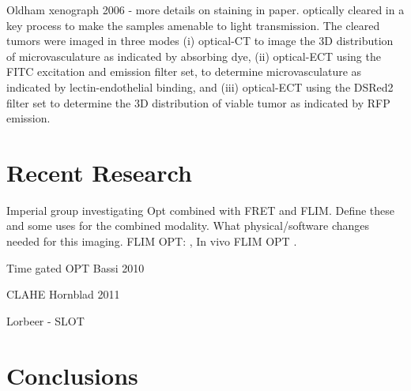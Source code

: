 \documentclass[12pt]{article}
\begin{document}
Oldham xenograph 2006 - more details on staining in paper.
optically cleared in a key process to make
 the samples amenable to light transmission. The cleared tumors were imaged in three modes (i)
 optical-CT to image the 3D distribution of microvasculature as indicated by absorbing dye, (ii)
 optical-ECT using the FITC excitation and emission filter set, to determine microvasculature as
 indicated by lectin-endothelial binding, and (iii) optical-ECT using the DSRed2 filter set to determine
 the 3D distribution of viable tumor as indicated by RFP emission. 



\section{Recent Research}

Imperial group investigating Opt combined with FRET and FLIM. Define these and some uses for the combined modality. What physical/software changes needed for this imaging.
FLIM OPT: \cite{McGinty:2008ix}, In vivo FLIM OPT \cite{McGinty:2011vm}.

 Time gated OPT Bassi 2010 \cite{Bassi:2010}
 
 CLAHE Hornblad 2011 \cite{Hornblad:2011fh}

Lorbeer - SLOT \cite{Lorbeer:2011}

\section{Conclusions}


\end{document}
